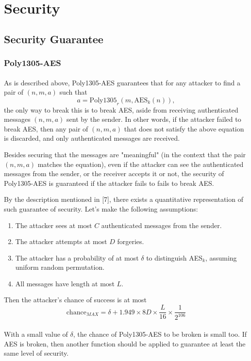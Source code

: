 \section{Security}
\subsection{Security Guarantee}
\subsubsection{Poly1305-AES}
\paragraph{} As is described above, Poly1305-AES guarantees that for any attacker to find a pair of $(n, m, a)$ such that 
$$
a = \text{Poly1305}_r(m, \text{AES}_k(n)),
$$
the only way to break this is to break AES, aside from receiving authenticated messages $(n,m,a)$ sent by the sender. In other words, if the attacker failed to break AES, then any pair of $(n,m,a)$ that does not satisfy the above equation is discarded, and only authenticated messages are received.\\
\par Besides securing that the messages are "meaningful" (in the context that the pair $(n,m,a)$ matches the equation), even if the attacker can see the authenticated messages from the sender, or the receiver accepts it or not, the security of Poly1305-AES is guaranteed if the attacker fails to fails to break AES.
\par By the description mentioned in [7], there exists a quantitative representation of such guarantee of security. Let's make the following assumptions:
\begin{enumerate}
    \item The attacker sees at most $C$ authenticated messages from the sender.
    \item The attacker attempts at most $D$ forgeries.
    \item The attacker has a probability of at most $\delta$ to distinguish AES$_{k}$, assuming uniform random permutation.
    \item All messages have length at most $L$.
\end{enumerate}
Then the attacker's chance of success is at most
$$
\text{chance}_{MAX} = \delta + 1.949 \times 8D \times \frac{L}{16} \times \frac{1}{2^{106}}
$$
\paragraph{}With a small value of $\delta$, the chance of Poly1305-AES to be broken is small too. If AES is broken, then another function should be applied to guarantee at least the same level of security.
